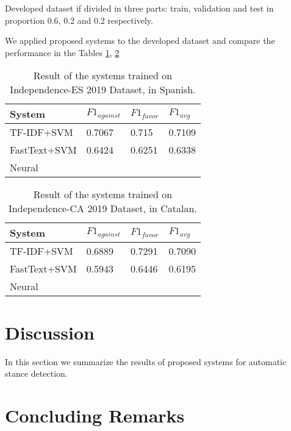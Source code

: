\documentclass[10pt, a4paper]{article}
\begin{document}
Developed dataset if divided in three parts: train, validation and  test in proportion 0.6, 0.2 and 0.2 respectively. 

We applied proposed systems to the developed dataset and compare the performance in the Tables \ref{tab:result_indep_es}, \ref{tab:result_indep_ca} 


\begin{table}[ht]
\begin{tabularx}{\columnwidth}{|l|l|l|X|}
\hline
System       & $F1_{against}$ & $F1_{favor}$&$F1_{avg}$\\ \hline
TF-IDF+SVM   & 0.7067     & 0.715    & 0.7109 \\ \hline
FastText+SVM & 0.6424     & 0.6251   & 0.6338 \\ \hline
Neural       &            &          &        \\ \hline
\end{tabularx}
\caption{Result of the systems trained on Independence-ES 2019 Dataset, in Spanish. }
\label{tab:result_indep_es}
\end{table}

\begin{table}[h]
\begin{tabularx}{\columnwidth}{|l|l|l|X|}
\hline
System&$F1_{against}$&$F1_{favor}$&$F1_{avg}$ \\ \hline
TF-IDF+SVM&0.6889&0.7291&0.7090\\
\hline
FastText+SVM & 0.5943&0.6446&0.6195\\ 
\hline
Neural  &   &   & \\ 
\hline
\end{tabularx}
\caption{Result of the systems trained on Independence-CA 2019 Dataset, in Catalan.}
\label{tab:result_indep_ca}
\end{table}


\section{Discussion}

In this section we summarize the results of proposed systems for automatic stance detection.



\section{Concluding Remarks}
\end{document}
